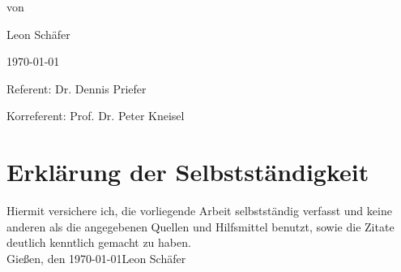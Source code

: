 \begin{titlepage}
\begin{center}
von
\par\end{center}

\begin{center}
Leon Schäfer
\par\end{center}

\begin{center}
\today
\par\end{center}

\vspace{1.5cm}


Referent: Dr. Dennis Priefer

Korreferent: Prof. Dr. Peter Kneisel

\end{titlepage}


\thispagestyle{empty}
\chapter*{Erklärung der Selbstständigkeit}
\thispagestyle{empty}
Hiermit versichere ich, die vorliegende Arbeit selbstständig verfasst und keine anderen als die angegebenen Quellen und Hilfsmittel benutzt, sowie die Zitate deutlich kenntlich gemacht zu haben.
\vspace{4\baselineskip}\\
Gießen, den \today \hfill Leon Schäfer
\vspace{4\baselineskip}\\
\clearpage
\mbox{}\thispagestyle{empty}

